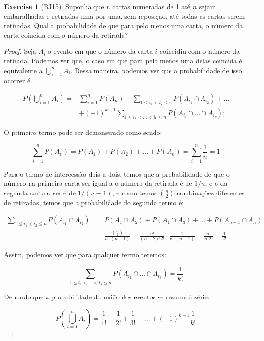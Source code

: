 \documentclass[
]{article}
\theoremstyle{definition}
\theoremstyle{definition}
\theoremstyle{definition}
\newtheorem{exercise}{Exercise}[section]
\theoremstyle{definition}
\theoremstyle{remark}
\begin{document}
\begin{exercise}[BJ15]

Suponha que \(n\) cartas numeradas de 1 até \(n\) sejam embaralhadas e retiradas uma por uma, sem reposição, até todas as cartas serem retiradas. Qual a probabilidade de que para pelo menos uma carta, o número da carta coincida com o número da retirada?

\begin{proof}
Seja \(A_{i}\) o evento em que o número da carta \(i\) coincidiu com o número da retirada. Podemos ver que, o caso em que para pelo menos uma delas coincida é equivalente a \(\bigcup_{i=1}^{n}A_{i}\). Dessa maneira, podemos ver que a probabilidade de isso ocorrer é:

\begin{align*}
P\left(\bigcup_{i=1}^{n} A_{i}\right) = &\sum_{i=1}^{n}P(A_{n}) - \sum_{1 \le i_{1} < i_{2} \le n}P(A_{i_{1}} \cap A_{i_{2}}) + \dots \\
&+ (-1)^{k-1} \sum_{1 \le i_{1} < \dots < i_{k} \le n}P(A_{i_{1}} \cap \dots \cap A_{i_{k}});
\end{align*}

O primeiro termo pode ser demonstrado como sendo:

\begin{equation*}
\sum_{i=1}^{n}P(A_{n}) = P(A_{1}) + P(A_{2}) + \dots + P(A_{n}) = \sum_{i=1}^{n}\frac{1}{n} = 1
\end{equation*}

Para o termo de intercessão dois a dois, temos que a probabilidade de que o número na primeira carta ser igual a o número da retirada é de \(1/n\), e o da segunda carta o ser é de \(1/(n-1)\), e como temos \(\binom{n}{2}\) combinações diferentes de retiradas, temos que a probabilidade do segundo termo é:

\begin{align*}
\sum_{1 \le i_{1} < i_{2} \le n}P(A_{i_{1}} \cap A_{i_{2}}) &= P(A_{1} \cap A_{2}) + P(A_{1} \cap A_{3}) + \dots + P(A_{n-1} \cap A_{n}) \\
&= \frac{\binom{n}{2}}{n \cdot (n-1)} = \frac{n!}{(n-2)!2!} \cdot \frac{1}{n \cdot (n-1)} = \frac{n!}{n!2!} = \frac{1}{2!}
\end{align*}

Assim, podemos ver que para qualquer termo teremos:

\begin{equation*}
\sum_{1 \le i_{1} < \dots < i_{k} \le n}P(A_{i_{1}} \cap \dots \cap A_{i_{k}}) = \frac{1}{k!}
\end{equation*}

De modo que a probabilidade da união dos eventos se resume à série:

\begin{equation*}
P\left(\bigcup_{i=1}^{n} A_{i}\right) = \frac{1}{1!} - \frac{1}{2!} + \frac{1}{3!} - \dots + (-1)^{k-1}\frac{1}{k!}
\end{equation*}
\end{proof}

\end{exercise}
\end{document}
